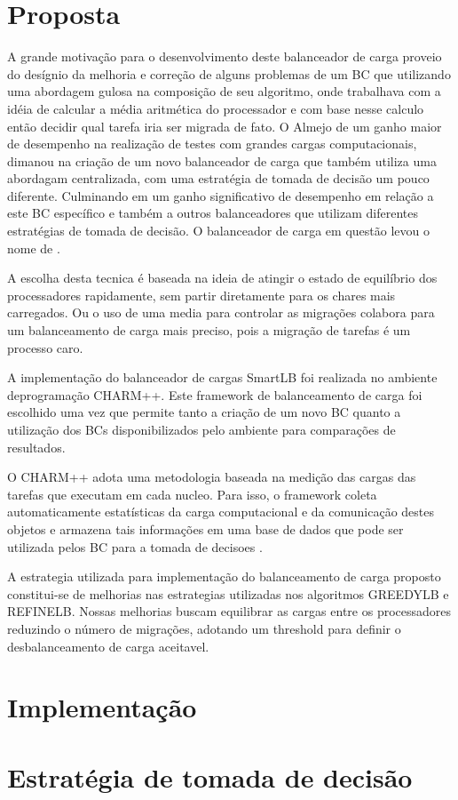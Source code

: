 \section{Proposta}
A grande motivação para o desenvolvimento deste balanceador de carga proveio do desígnio da melhoria e correção de alguns problemas de um BC que utilizando uma abordagem gulosa na composição de seu algoritmo, onde trabalhava com a idéia de calcular a média aritmética do processador e com base nesse calculo então decidir qual tarefa iria ser migrada de fato. O Almejo de um ganho maior de desempenho na realização de testes com grandes cargas computacionais, dimanou na criação de um novo balanceador de carga que também utiliza uma abordagam centralizada, com uma estratégia de tomada de decisão um pouco diferente. Culminando em um ganho significativo de desempenho em relação a este BC específico e também a outros balanceadores que utilizam diferentes estratégias de tomada de decisão. O balanceador de carga em questão levou o nome de \newlb.    

A escolha desta tecnica é baseada na ideia de atingir o estado de equilíbrio dos processadores rapidamente, sem partir diretamente para os chares mais carregados. Ou o uso de uma media para controlar as migrações colabora para um balanceamento de carga mais preciso, pois a migração de tarefas é um processo caro. 


A implementação do balanceador de cargas SmartLB foi realizada no ambiente deprogramação CHARM++. Este framework de balanceamento de carga foi escolhido uma vez que permite tanto a criação de um novo BC quanto a utilização dos BCs disponibilizados pelo ambiente para comparações de resultados. 

O CHARM++ adota uma metodologia baseada na medição das cargas das tarefas que executam em cada nucleo. Para isso, o framework coleta automaticamente estatísticas da carga computacional e da comunicação destes objetos e armazena tais informações em uma base de dados que pode ser utilizada pelos BC para a tomada de decisoes \cite{jyothi2004debugging}.

A estrategia utilizada para implementação do balanceamento de carga proposto constitui-se de melhorias nas estrategias utilizadas nos algoritmos GREEDYLB e REFINELB. Nossas melhorias buscam equilibrar as cargas entre os processadores reduzindo o número de migrações, adotando um threshold para definir o desbalanceamento de carga aceitavel. 


\section{Implementação}
\section{Estratégia de tomada de decisão}
